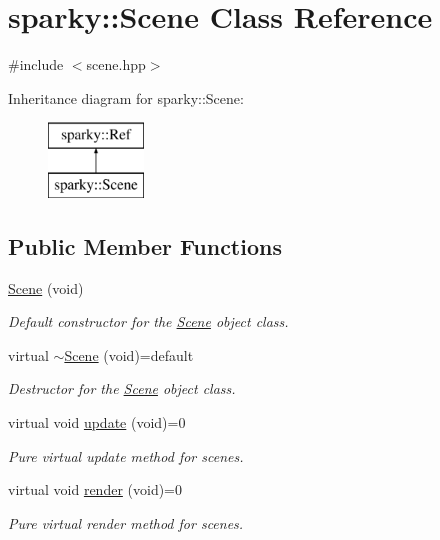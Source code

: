 \hypertarget{classsparky_1_1_scene}{}\section{sparky\+:\+:Scene Class Reference}
\label{classsparky_1_1_scene}


{\ttfamily \#include $<$scene.\+hpp$>$}

Inheritance diagram for sparky\+:\+:Scene\+:\begin{figure}[H]
\begin{center}
\leavevmode
\includegraphics[height=2.000000cm]{classsparky_1_1_scene}
\end{center}
\end{figure}
\subsection*{Public Member Functions}
\begin{DoxyCompactItemize}
\item 
\hyperlink{classsparky_1_1_scene_a39f382a2e4f39ef9585e282bcd7bd8fc}{Scene} (void)\hypertarget{classsparky_1_1_scene_a39f382a2e4f39ef9585e282bcd7bd8fc}{}\label{classsparky_1_1_scene_a39f382a2e4f39ef9585e282bcd7bd8fc}

\begin{DoxyCompactList}\small\item\em Default constructor for the \hyperlink{classsparky_1_1_scene}{Scene} object class. \end{DoxyCompactList}\item 
virtual \hyperlink{classsparky_1_1_scene_afac76d9ed35f5a3abf24d48ac2c7c79c}{$\sim$\+Scene} (void)=default\hypertarget{classsparky_1_1_scene_afac76d9ed35f5a3abf24d48ac2c7c79c}{}\label{classsparky_1_1_scene_afac76d9ed35f5a3abf24d48ac2c7c79c}

\begin{DoxyCompactList}\small\item\em Destructor for the \hyperlink{classsparky_1_1_scene}{Scene} object class. \end{DoxyCompactList}\item 
virtual void \hyperlink{classsparky_1_1_scene_a108c7eab94934c57a7e92aa52d735117}{update} (void)=0
\begin{DoxyCompactList}\small\item\em Pure virtual update method for scenes. \end{DoxyCompactList}\item 
virtual void \hyperlink{classsparky_1_1_scene_ac1018bd5a77e5505e3a40a186e171aea}{render} (void)=0
\begin{DoxyCompactList}\small\item\em Pure virtual render method for scenes. \end{DoxyCompactList}\end{DoxyCompactItemize}
